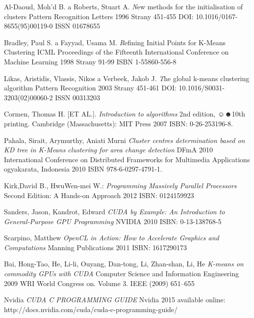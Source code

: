 \begin{thebibliography}{99}
{\sc Al-Daoud}, Moh'd B. a {\sc Roberts}, Stuart A.
{\emph New methods for the initialisation of clusters}
Pattern Recognition Letters
1996
Strany 451-455
DOI: 10.1016/0167-8655(95)00119-0
ISSN 01678655

{\sc Bradley}, Paul S. a {\sc Fayyad}, Usama M.
{\emph Refining Initial Points for K-Means Clustering}
ICML Proceedings of the Fifteenth International Conference on Machine Learning
1998
Strany 91-99
ISBN 1-55860-556-8

{\sc Likas}, Aristidis, {\sc Vlassis}, Nikos a {\sc Verbeek}, Jakob J.
{\emph The global k-means clustering algorithm}
Pattern Recognition
2003
Strany 451-461
DOI: 10.1016/S0031-3203(02)00060-2
ISSN 00313203

{\sc Cormen,} Thomas H. [ET AL.].
\emph{Introduction to algorithms}
2nd edition, ☺☻10th printing.
Cambridge (Massachusetts): MIT Press
2007 
ISBN: 0-26-253196-8.

{\sc Pahala,} Sirait, {\sc Arymurthy,} Aniati Murni
\emph{Cluster centres determination based on KD tree in K-Means clustering for area change detection}
DFmA 2010 International Conference on Distributed Frameworks for Multimedia Applications
ogyakarata, Indonesia
2010 
ISBN 978-6-0297-4791-1.

{\sc Kirk,}David B., {\sc Hwu}Wen-mei W.:
\emph{Programming Massively Parallel Processors}
Second Edition: A Hands-on Approach
2012
ISBN: 0124159923 

{\sc Sanders,} Jason, {\sc Kandrot,} Edward
\emph{CUDA by Example: An Introduction to General-Purpose GPU Programming}
NVIDIA
2010
ISBN: 0-13-138768-5 

{\sc Scarpino,} Matthew
\emph{OpenCL in Action: How to Accelerate Graphics and Computations}
Manning Publications
2011
ISBN: 1617290173 

{\sc Bai,} Hong-Tao, {\sc He,} Li-li, {\sc Ouyang,} Dan-tong, {\sc Li,} Zhan-shan, {\sc Li, } He
\emph{K-means on commodity GPUs with CUDA}
Computer Science and Information Engineering
2009
WRI World Congress on. Volume 3.
IEEE (2009) 651–655 

Nvidia
\emph{CUDA C PROGRAMMING GUIDE}
Nvidia
2015
available online: http://docs.nvidia.com/cuda/cuda-c-programming-guide/
\end{thebibliography}